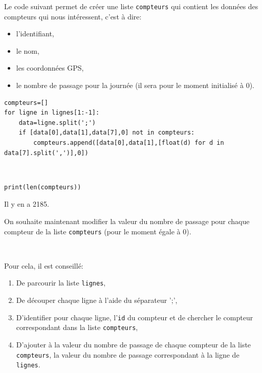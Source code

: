 Le code suivant permet de créer une liste \verb?compteurs? qui contient les données des compteurs qui nous intéressent, c'est à dire:
\begin{itemize}
 \item l'identifiant,
 \item le nom,
 \item les coordonnées GPS,
 \item le nombre de passage pour la journée (il sera pour le moment initialisé à 0).
\end{itemize}

\begin{verbatim}
compteurs=[]
for ligne in lignes[1:-1]:
    data=ligne.split(';')
    if [data[0],data[1],data[7],0] not in compteurs:
        compteurs.append([data[0],data[1],[float(d) for d in data[7].split(',')],0])
\end{verbatim}


\begin{solution}~\ \\
\begin{verbatim}
print(len(compteurs))
\end{verbatim}
Il y en a 2185.
\end{solution}

On souhaite maintenant modifier la valeur du nombre de passage pour chaque compteur de la liste \verb?compteurs? (pour le moment égale à 0).

~\

Pour cela, il est conseillé:
\begin{enumerate}
 \item De parcourir la liste \verb?lignes?,
 \item De découper chaque ligne à l'aide du séparateur ';',
 \item D'identifier pour chaque ligne, l'\verb?id? du compteur et de chercher le compteur correspondant dans la liste \verb?compteurs?,
 \item D'ajouter à la valeur du nombre de passage de chaque compteur de la liste \verb?compteurs?, la valeur du nombre de passage correspondant à la ligne de \verb?lignes?.
\end{enumerate}



